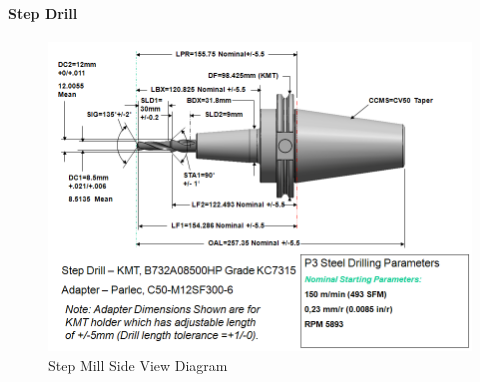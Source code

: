 \pagebreak

\paragraph{Step Drill}\mbox{}
\label{sec:Step Drill}

\begin{figure}[ht]
  \centering
    \includegraphics[width=1.0\textwidth]{figures/Step Mill Side View.png}
  \caption{Step Mill Side View Diagram}
  \label{fig:Step Mill Side View Diagram}
\end{figure}

\FloatBarrier


